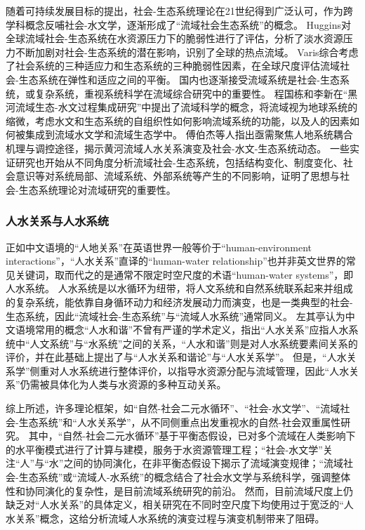 随着可持续发展目标的提出，社会-生态系统理论在21世纪得到广泛认可，作为跨学科概念反哺社会-水文学，逐渐形成了“流域社会生态系统”的概念。
Huggins对全球流域社会-生态系统在水资源压力下的脆弱性进行了评估，分析了淡水资源压力不断加剧对社会-生态系统的潜在影响，识别了全球的热点流域\cite{huggins2022}。
Varis综合考虑了社会系统的三种适应力和生态系统的三种脆弱性因素，在全球尺度评估流域社会-生态系统在弹性和适应之间的平衡\cite{varis2019}。
国内也逐渐接受流域系统是社会-生态系统，或复杂系统，重视系统科学在流域综合研究中的重要性。
程国栋和李新在“黑河流域生态-水文过程集成研究”中提出了流域科学的概念，将流域视为地球系统的缩微，考虑水文和生态系统的自组织性如何影响流域系统的功能，以及人的因素如何被集成到流域水文学和流域生态学中\cite{cheng2015}。
傅伯杰等人指出亟需聚焦人地系统耦合机理与调控途径，揭示黄河流域人水关系演变及社会-水文-生态系统动态\cite{fu2021a}。
一些实证研究也开始从不同角度分析流域社会-生态系统，包括结构变化\cite{song2022}、制度变化\cite{wang2019d}、社会意识\cite{liu2023}等对系统局部、流域系统、外部系统等产生的不同影响，证明了思想与社会-生态系统理论对流域研究的重要性。

\subsubsection*{人水关系与人水系统}

正如中文语境的“人地关系”在英语世界一般等价于“human-environment interactions”\cite{li2016c, liu2023}，“人水关系”直译的“human-water relationship”也并非英文世界的常见关键词，取而代之的是通常不限定时空尺度的术语“human-water systems”，即人水系统\cite{konar2019}。
人水系统是以水循环为纽带，将人文系统和自然系统联系起来并组成的复杂系统，能依靠自身循环动力和经济发展动力而演变\cite{zuo2007}，也是一类典型的社会-生态系统，因此“流域社会-生态系统”与“流域人水系统”通常同义\cite{yu2020}。
左其亭认为中文语境常用的概念“人水和谐”不曾有严谨的学术定义\cite{zuo2007}，指出“人水关系”应指人水系统中“人文系统”与“水系统”之间的关系，“人水和谐”则是对人水系统要素间关系的评价，并在此基础上提出了与“人水关系和谐论”与“人水关系学”\cite{zuoqiting2022, zuo2016a}。
但是，“人水关系学”侧重对人水系统进行整体评价，以指导水资源分配与流域管理，因此“人水关系”仍需被具体化为人类与水资源的多种互动关系\cite{zuo2016, zuo2020a}。

综上所述，许多理论框架，如“自然-社会二元水循环”、“社会-水文学”、“流域社会-生态系统”和“人水关系学”，从不同侧重点出发重视水的自然-社会双重属性研究。
其中，“自然-社会二元水循环”基于平衡态假设，已对多个流域在人类影响下的水平衡模式进行了计算与建模，服务于水资源管理工程；“社会-水文学”关注“人”与“水”之间的协同演化，在非平衡态假设下揭示了流域演变规律；“流域社会-生态系统”或“流域人-水系统”的概念结合了社会水文学与系统科学，强调整体性和协同演化的复杂性，是目前流域系统研究的前沿。
然而，目前流域尺度上仍缺乏对“人水关系”的具体定义，相关研究在不同时空尺度下均使用过于宽泛的“人水关系”概念，这给分析流域人水系统的演变过程与演变机制带来了阻碍。
